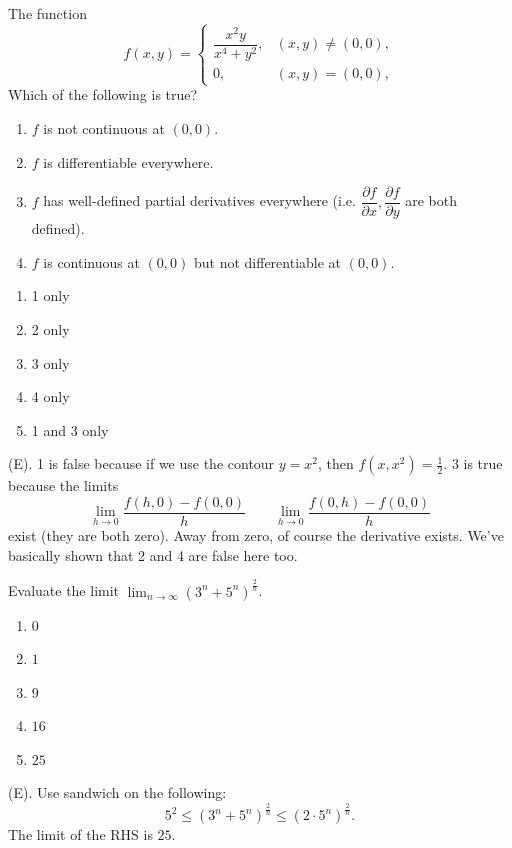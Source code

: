 \begin{exercise}
The function
\[
f(x,y)=
\begin{cases}
\dfrac{x^2y}{x^4+y^2}, & (x,y)\neq(0,0),\\[6pt]
0, & (x,y)=(0,0),
\end{cases}
\]
Which of the following is true?

\begin{enumerate}
    \item $f$ is not continuous at $(0,0)$.
    \item $f$ is differentiable everywhere.
    \item $f$ has well-defined partial derivatives everywhere
    (i.e. $\dfrac{\partial f}{\partial x},\dfrac{\partial f}{\partial y}$
    are both defined).
    \item $f$ is continuous at $(0,0)$ but not differentiable at $(0,0)$.
\end{enumerate}
\begin{enumerate}[label=(\Alph*)]
    \item 1 only
    \item 2 only
    \item 3 only
    \item 4 only
    \item 1 and 3 only
\end{enumerate}
\end{exercise}
\begin{solution}
(E). 1 is false because if we use the contour $y = x^2$, then $f(x,x^2) = \frac{1}{2}$.
3 is true because the limits
\[
\lim_{h \rightarrow 0} \frac{f(h,0) - f(0,0)}{h} \qquad 
\lim_{h \rightarrow 0} \frac{f(0,h) - f(0,0)}{h} 
\]
exist (they are both zero). Away from zero, of course the derivative exists.
We've basically shown that 2 and 4 are false here too.
\end{solution}

\begin{exercise}
Evaluate the limit $\lim_{n\to\infty}\left(3^n+5^n\right)^{\frac{2}{n}}$.
\begin{enumerate}[label=(\alph*)]
    \item $0$
    \item $1$
    \item $9$
    \item $16$
    \item $25$
\end{enumerate}
\end{exercise}
\begin{solution}
(E). Use sandwich on the following:
\[
5^2 \leq \left(3^n+5^n\right)^{\frac{2}{n}} \leq (2 \cdot 5^n)^{\frac{2}{n}}.
\]
The limit of the RHS is $25$.
\end{solution}

